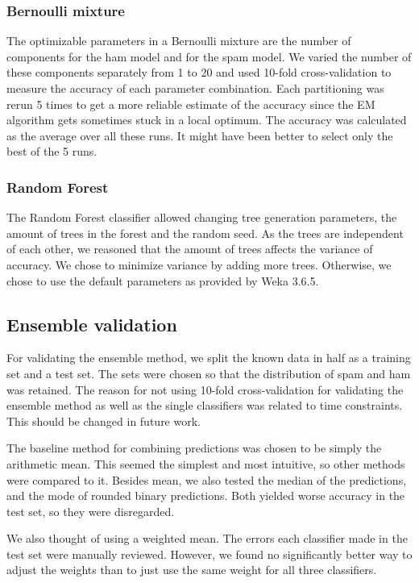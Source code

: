 \subsubsection{Bernoulli mixture}

The optimizable parameters in a Bernoulli mixture are the number of
components for the ham model and for the spam model. We varied the
number of these components separately from 1 to 20 and used 10-fold
cross-validation to measure the accuracy of each parameter combination.
Each partitioning was rerun 5 times to get a more reliable estimate of
the accuracy since the EM algorithm gets sometimes stuck in a local
optimum. The accuracy was calculated as the average over all these runs.
It might have been better to select only the best of the 5 runs.

\subsubsection{Random Forest}

The Random Forest classifier allowed changing tree generation
parameters, the amount of trees in the forest and the random seed. As
the trees are independent of each other, we reasoned that the amount of
trees affects the variance of accuracy. We chose to minimize variance by
adding more trees. Otherwise, we chose to use the default parameters as
provided by Weka 3.6.5.

\subsection{Ensemble validation}

For validating the ensemble method, we split the known data in half as a
training set and a test set. The sets were chosen so that the
distribution of spam and ham was retained. The reason for not using
10-fold cross-validation for validating the ensemble method as well as
the single classifiers was related to time constraints. This should be
changed in future work.

The baseline method for combining predictions was chosen to be simply
the arithmetic mean. This seemed the simplest and most intuitive, so
other methods were compared to it. Besides mean, we also tested the
median of the predictions, and the mode of rounded binary predictions.
Both yielded worse accuracy in the test set, so they were disregarded.

We also thought of using a weighted mean. The errors each classifier
made in the test set were manually reviewed. However, we found no
significantly better way to adjust the weights than to just use the same
weight for all three classifiers.
